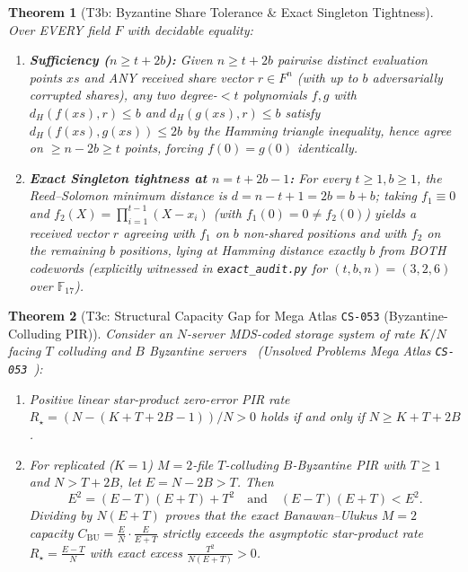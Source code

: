\documentclass[11pt,reqno]{amsart}
\newtheorem{theorem}{Theorem}[section]
\theoremstyle{definition}
\newcommand{\F}{\mathbb{F}}
\newcommand{\code}[1]{\texttt{\small #1}}
\begin{document}
\begin{theorem}[T3b: Byzantine Share Tolerance \& Exact Singleton Tightness]
\label{thm:t3b}
Over EVERY field $F$ with decidable equality:
\begin{enumerate}[leftmargin=1.8em]
  \item \textbf{Sufficiency ($n \ge t + 2b$):} Given $n \ge t + 2b$ pairwise distinct evaluation points $xs$ and ANY received share vector $r \in F^n$ (with up to $b$ adversarially corrupted shares), any two degree-$<t$ polynomials $f, g$ with $d_H(f(xs), r) \le b$ and $d_H(g(xs), r) \le b$ satisfy $d_H(f(xs), g(xs)) \le 2b$ by the Hamming triangle inequality, hence agree on $\ge n - 2b \ge t$ points, forcing $f(0) = g(0)$ identically.
  \item \textbf{Exact Singleton tightness at $n = t + 2b - 1$:} For every $t \ge 1, b \ge 1$, the Reed--Solomon minimum distance is $d = n - t + 1 = 2b = b + b$; taking $f_1 \equiv 0$ and $f_2(X) = \prod_{i=1}^{t-1}(X - x_i)$ (with $f_1(0) = 0 \ne f_2(0)$) yields a received vector $r$ agreeing with $f_1$ on $b$ non-shared positions and with $f_2$ on the remaining $b$ positions, lying at Hamming distance exactly $b$ from BOTH codewords (explicitly witnessed in \code{exact\_audit.py} for $(t,b,n)=(3,2,6)$ over $\F_{17}$).
\end{enumerate}
\end{theorem}

\begin{theorem}[T3c: Structural Capacity Gap for Mega Atlas \code{CS-053} (Byzantine-Colluding PIR)]
\label{thm:t3c}
Consider an $N$-server MDS-coded storage system of rate $K/N$ facing $T$ colluding and $B$ Byzantine servers~\cite{freijhollanti2017,banawan2019} (Unsolved Problems Mega Atlas \code{CS-053}~\cite{mega_atlas_2026}):
\begin{enumerate}[leftmargin=1.8em]
  \item Positive linear star-product zero-error PIR rate $R_{\star} = (N - (K + T + 2B - 1))/N > 0$ holds if and only if $N \ge K + T + 2B$.
  \item For replicated ($K = 1$) $M = 2$-file $T$-colluding $B$-Byzantine PIR with $T \ge 1$ and $N > T + 2B$, let $E = N - 2B > T$. Then
  \[
    E^2 = (E - T)(E + T) + T^2 \quad\text{and}\quad (E - T)(E + T) < E^2.
  \]
  Dividing by $N(E + T)$ proves that the exact Banawan--Ulukus $M = 2$ capacity $C_{\mathrm{BU}} = \frac{E}{N}\cdot \frac{E}{E + T}$ strictly exceeds the asymptotic star-product rate $R_{\star} = \frac{E - T}{N}$ with exact excess $\frac{T^2}{N(E + T)} > 0$.
\end{enumerate}
\end{theorem}
\end{document}
